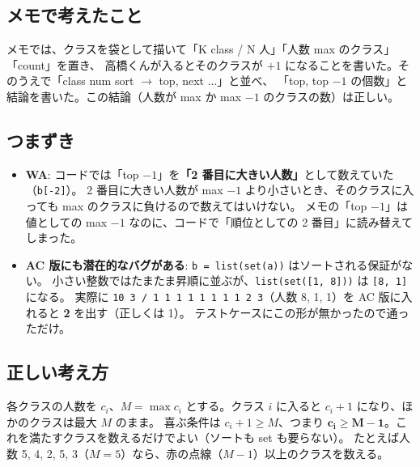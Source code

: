 \documentclass[a4paper]{article}
\begin{document}
\subsection*{メモで考えたこと}
メモでは、クラスを袋として描いて「K class / N 人」「人数 max のクラス」「count」を置き、
高橋くんが入るとそのクラスが $+1$ になることを書いた。そのうえで「class num sort $\to$ top, next ...」と並べ、
「top, top $-1$ の個数」と結論を書いた。この結論（人数が max か max $-1$ のクラスの数）は正しい。

\subsection*{つまずき}
\begin{itemize}
  \item \textbf{WA}: コードでは「top $-1$」を\textbf{「2 番目に大きい人数」}として数えていた（\verb|b[-2]|）。
    2 番目に大きい人数が max $-1$ より小さいとき、そのクラスに入っても max のクラスに負けるので数えてはいけない。
    メモの「top $-1$」は値としての max $-1$ なのに、コードで「順位としての 2 番目」に読み替えてしまった。
  \item \textbf{AC 版にも潜在的なバグがある}: \verb|b = list(set(a))| はソートされる保証がない。
    小さい整数ではたまたま昇順に並ぶが、\verb|list(set([1, 8]))| は \verb|[8, 1]| になる。
    実際に \texttt{10 3 / 1 1 1 1 1 1 1 1 2 3}（人数 8, 1, 1）を AC 版に入れると \textbf{2} を出す（正しくは 1）。
    テストケースにこの形が無かったので通っただけ。
\end{itemize}

\subsection*{正しい考え方}
各クラスの人数を $c_i$、$M = \max c_i$ とする。クラス $i$ に入ると $c_i + 1$ になり、ほかのクラスは最大 $M$ のまま。
喜ぶ条件は $c_i + 1 \geq M$、つまり $\boldsymbol{c_i \geq M - 1}$。これを満たすクラスを数えるだけでよい（ソートも set も要らない）。
たとえば人数 5, 4, 2, 5, 3（$M=5$）なら、赤の点線（$M-1$）以上のクラスを数える。

\begin{center}
\end{center}
\end{document}
